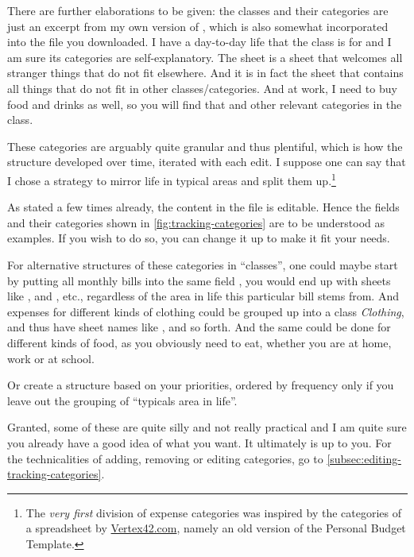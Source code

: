 There are further elaborations to be given:
the classes and their categories are just an excerpt from my own version of \tfn, which is also somewhat incorporated into the file you downloaded.
I have a day-to-day life that the class  is for and I am sure its categories are self-explanatory.
The sheet  is a sheet that welcomes all stranger things that do not fit elsewhere.
And it is in fact the sheet that contains all  things that do not fit in other classes/categories.
And at work, I need to buy food and drinks as well, so you will find that and other relevant categories in the  class.

These categories are arguably quite granular and thus plentiful, which is how the structure developed over time, iterated with each edit.
I suppose one can say that I chose a strategy to mirror life in typical areas and split them up.\footnote{The \emph{very first} division of expense categories was inspired by the categories of a spreadsheet by \href{https://www.vertex42.com/}{Vertex42.com}, namely an old version of the Personal Budget Template.}

As stated a few times already, the content in the file is editable.
Hence the fields and their categories shown in \autoref{fig:tracking-categories} are to be understood as examples.
If you wish to do so, you can change it up to make it fit your needs.

For alternative structures of these categories in ``classes'', one could maybe start by putting all monthly bills into the same field , \ie you would end up with sheets like ,  and , etc., regardless of the area in life this particular bill stems from.
And expenses for different kinds of clothing could be grouped up into a class \emph{Clothing}, and thus have sheet names like ,  and so forth.
And the same could be done for different kinds of food, as you obviously need to eat, whether you are at home, work or at school.

Or create a structure based on your priorities, ordered by frequency only if you leave out the grouping of ``typicals area in life''.

Granted, some of these are quite silly and not really practical and I am quite sure you already have a good idea of what you want.
It ultimately is up to you.
For the technicalities of adding, removing or editing categories, go to \autoref{subsec:editing-tracking-categories}.

